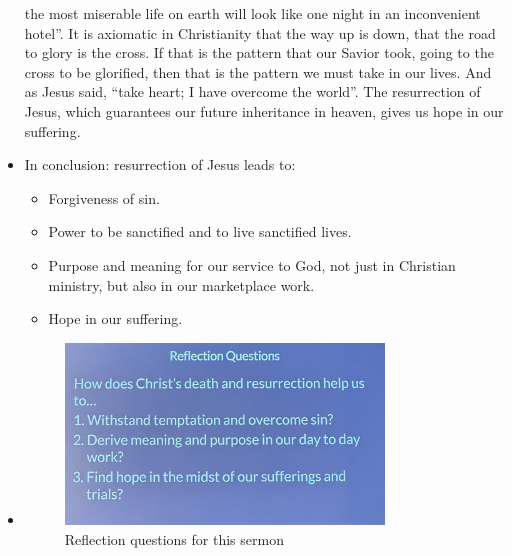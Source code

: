 \begin{itemize}
{  the most miserable life on earth will look like one night in an
  inconvenient hotel''. It is axiomatic in Christianity that the way up is down, that the road to glory is the cross. If that is the pattern that our Savior took, going to the cross to be glorified, then that is the pattern we must take in our lives. And as Jesus said, ``take heart; I have overcome the world''. The resurrection of Jesus, which guarantees our future inheritance in heaven, gives us hope in our suffering. }
  \item{In conclusion: resurrection of Jesus leads to:
  \begin{itemize}
    \item{Forgiveness of sin.}
    \item{Power to be sanctified and to live sanctified lives.}
    \item{Purpose and meaning for our service to God, not just in Christian ministry, but also in our marketplace work.}
    \item{Hope in our suffering.}
  \end{itemize}
  }
  \item{\begin{figure}[H]
    \centering
    \includegraphics[width=0.8\textwidth, trim={0cm 0cm 0cm 0cm},clip]{Figures/aprilSermon2Reflections.jpg}
    \caption[]{Reflection questions for this sermon}
  \end{figure}}
\end{itemize}
